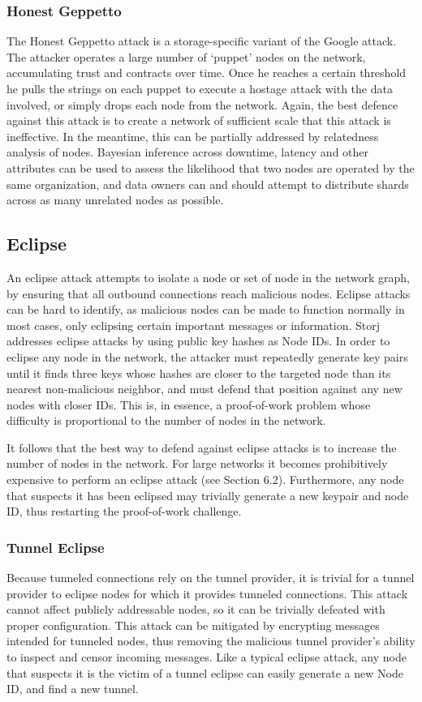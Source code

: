 \documentclass[a4paper,10pt]{article}
\begin{document}
\subsubsection{Honest Geppetto}
The Honest Geppetto attack is a storage-specific variant of the Google attack.
The attacker operates a large number of ‘puppet’ nodes on the network,
accumulating trust and contracts over time. Once he reaches a certain threshold
he pulls the strings on each puppet to execute a hostage attack with the data
involved, or simply drops each node from the network. Again, the best defence
against this attack is to create a network of sufficient scale that this attack
is ineffective. In the meantime, this can be partially addressed by relatedness
analysis of nodes. Bayesian inference across downtime, latency and other
attributes can be used to assess the likelihood that two nodes are operated by
the same organization, and data owners can and should attempt to distribute
shards across as many unrelated nodes as possible.

\subsection{Eclipse}
An eclipse attack attempts to isolate a node or set of node in the network
graph, by ensuring that all outbound connections reach malicious nodes. Eclipse
attacks can be hard to identify, as malicious nodes can be made to function
normally in most cases, only eclipsing certain important messages or
information. Storj addresses eclipse attacks by using public key hashes as Node
IDs. In order to eclipse any node in the network, the attacker must repeatedly
generate key pairs until it finds three keys whose hashes are closer to the
targeted node than its nearest non-malicious neighbor, and must defend that
position against any new nodes with closer IDs. This is, in essence, a
proof-of-work problem whose difficulty is proportional to the number of nodes in
the network.

It follows that the best way to defend against eclipse attacks is to increase
the number of nodes in the network. For large networks it becomes prohibitively
expensive to perform an eclipse attack (see Section 6.2). Furthermore, any node
that suspects it has been eclipsed may trivially generate a new keypair and node
ID, thus restarting the proof-of-work challenge.

\subsubsection{Tunnel Eclipse}
Because tunneled connections rely on the tunnel provider, it is trivial for a
tunnel provider to eclipse nodes for which it provides tunneled connections.
This attack cannot affect publicly addressable nodes, so it can be trivially
defeated with proper configuration. This attack can be mitigated by encrypting
messages intended for tunneled nodes, thus removing the malicious tunnel
provider's ability to inspect and censor incoming messages. Like a typical
eclipse attack, any node that suspects it is the victim of a tunnel eclipse can
easily generate a new Node ID, and find a new tunnel.
\end{document}
